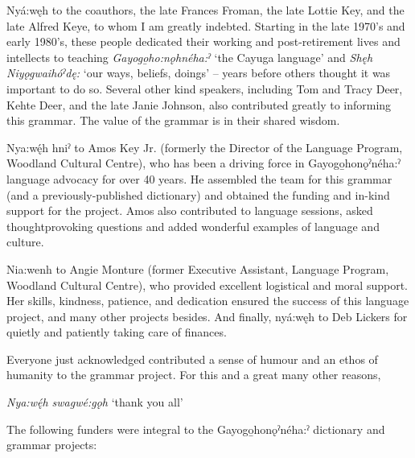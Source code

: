 Nyá:węh to the coauthors, the late Frances Froman, the late Lottie Key, and the late Alfred Keye, to whom I am greatly indebted. Starting in the late 1970’s and early 1980’s, these people dedicated their working and post-retirement lives and intellects to teaching \textit{Gayogo̱ho:nǫhnéha:ˀ} ‘the Cayuga language’ and \textit{Shęh Niyǫgwaihóˀdę:} ‘our ways, beliefs, doings’ -- years before others thought it was important to do so. Several other kind speakers, including Tom and Tracy Deer, Kehte Deer, and the late Janie Johnson, also contributed greatly to informing this grammar. The value of the grammar is in their shared wisdom. 

Nya:wę́h hniˀ to Amos Key Jr. (formerly the Director of the Language Program, Woodland Cultural Centre), who has been a driving force in Gayogo̱honǫˀnéha:ˀ language advocacy for over 40 years. He assembled the team for this grammar (and a previously-published dictionary) and obtained the funding and in-kind support for the project. Amos also contributed to language sessions, asked thought\-provoking questions and added wonderful examples of language and culture. 

Nia:wenh to Angie Monture (former Executive Assistant, Language Program, Woodland Cultural Centre), who provided excellent logistical and moral support. Her skills, kindness, patience, and dedication ensured the success of this language project, and many other projects besides. And finally, nyá:węh to Deb Lickers for quietly and patiently taking care of finances.

Everyone just acknowledged contributed a sense of humour and an ethos of  humanity to the grammar project. For this and a great many other reasons, 

\begin{center}
\textit{Nya:wę́h swagwé:gǫh} ‘thank you all’
\end{center}

The following funders were integral to the Gayogo̱honǫˀnéha:ˀ dictionary and grammar projects: 

